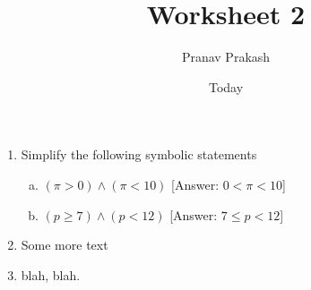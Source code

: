 \documentclass[]{article}
\begin{document}
\title{Worksheet 2}
\author{Pranav Prakash}
\date{Today}
\maketitle


\begin{enumerate}
  \item Simplify the following symbolic statements
  \begin{enumerate}[(a)]
  	\item $(\pi > 0) \wedge (\pi < 10)$ \hfill [Answer: $0 < \pi < 10$]
  	\item $(p \geq 7) \wedge (p < 12)$ \hfill [Answer: $7 \leq p < 12$]
  \end{enumerate}
  \item Some more text
  \item blah, blah.
\end{enumerate}
\end{document}
